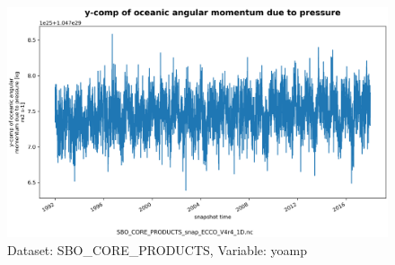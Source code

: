 \begin{figure}[H]
\centering
\includegraphics[scale=0.55]{../images/plots/oneD_plots/SBO_Core_Products/yoamp.png}
\caption{Dataset: SBO\_CORE\_PRODUCTS, Variable: yoamp}
\label{tab:table-SBO_CORE_PRODUCTS_yoamp-Plot}
\end{figure}
\newpage
\pagebreak
